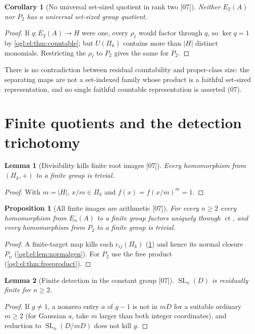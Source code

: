 \documentclass[11pt,oneside]{article}
\numberwithin{equation}{section}
\newtheorem{proposition}[proposition]{Proposition}
\newtheorem{lemma}[lemma]{Lemma}
\newtheorem{corollary}[corollary]{Corollary}
\theoremstyle{definition}
\theoremstyle{remark}
\newcommand{\ct}{\operatorname{ct}}
\newcommand{\SL}{\operatorname{SL}}
\newcommand{\src}[1]{\textup{\textsf{\small[#1]}}}
\begin{document}
\begin{corollary}[No universal set-sized quotient in rank two \src{07}]\label{ogl:el:cor:nouniversal}
Neither $E_2(A)$ nor $P_2$ has a universal set-sized group quotient.
\end{corollary}
\begin{proof}
If $q:E_2(A)\to H$ were one, every $\rho_\ell$ would factor through $q$, so
$\ker q=1$ by \cref{ogl:el:thm:countable}; but $U(\Pi_k)$ contains more than
$|H|$ distinct monomials. Restricting the $\rho_\ell$ to $P_2$ gives the same for
$P_2$.
\end{proof}

There is no contradiction between residual countability and proper-class size:
the separating maps are not a set-indexed family whose product is a faithful
set-sized representation, and no single faithful countable representation is
asserted (07).

\section{Finite quotients and the detection trichotomy}\label{ogl:el:sec:finite}

\begin{lemma}[Divisibility kills finite root images \src{07}]\label{ogl:el:lem:finite}
Every homomorphism from $(\Pi_k,+)$ to a finite group is trivial.
\end{lemma}
\begin{proof}
With $m=|H|$, $x/m\in\Pi_k$ and $f(x)=f(x/m)^m=1$.
\end{proof}

\begin{proposition}[All finite images are arithmetic \src{07}]\label{ogl:el:prop:finitefactor}
For every $n\ge2$ every homomorphism from $E_n(A)$ to a finite group factors
uniquely through $\ct$, and every homomorphism from $P_2$ to a finite group is
trivial.
\end{proposition}
\begin{proof}
A finite-target map kills each $e_{ij}(\Pi_k)$ (\cref{ogl:el:lem:finite}) and
hence its normal closure $P_n$ (\cref{ogl:el:lem:normalgen}). For $P_2$ use the
free product (\cref{ogl:el:thm:freeproduct}).
\end{proof}

\begin{lemma}[Finite detection in the constant group \src{07}]\label{ogl:el:lem:ordinaryrf}
$\SL_n(D)$ is residually finite for $n\ge2$.
\end{lemma}
\begin{proof}
If $g\ne1$, a nonzero entry $a$ of $g-1$ is not in $mD$ for a suitable ordinary
$m\ge2$ (for Gaussian $a$, take $m$ larger than both integer coordinates), and
reduction to $\SL_n(D/mD)$ does not kill $g$.
\end{proof}
\end{document}
